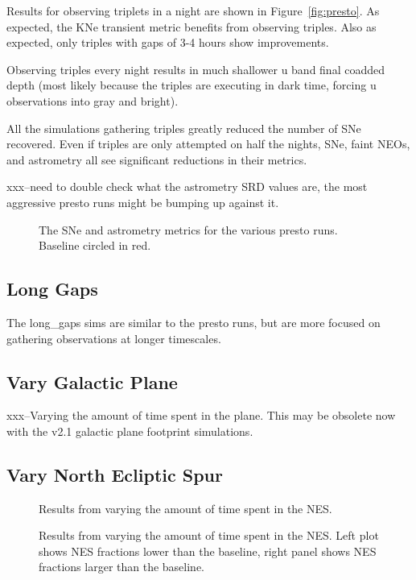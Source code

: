 Results for observing triplets in a night are shown in Figure~\ref{fig:presto}. As expected, the KNe transient metric benefits from observing triples. Also as expected, only triples with gaps of 3-4 hours show improvements.  

Observing triples every night results in much shallower u band final coadded depth (most likely because the triples are executing in dark time, forcing u observations into gray and bright). 

All the simulations gathering triples greatly reduced the number of SNe recovered. Even if triples are only attempted on half the nights, SNe, faint NEOs, and astrometry all see significant reductions in their metrics.


xxx--need to double check what the astrometry SRD values are, the most aggressive presto runs might be bumping up against it.

\begin{figure}
\caption{The SNe and astrometry metrics for the various presto runs. Baseline circled in red. \label{fig:presto_metics} }
\end{figure}

\subsection{Long Gaps}

The long\_gaps sims are similar to the presto runs, but are more focused on gathering observations at longer timescales.

\subsection{Vary Galactic Plane}

xxx--Varying the amount of time spent in the plane. This may be obsolete now with the v2.1 galactic plane footprint simulations. 


\subsection{Vary North Ecliptic Spur}

\begin{figure}
\caption{Results from varying the amount of time spent in the NES. \label{fig:vary_nes}}
\end{figure}

\begin{figure}
\caption{Results from varying the amount of time spent in the NES. Left plot shows NES fractions lower than the baseline, right panel shows NES fractions larger than the baseline.\label{fig:vary_nes_mags}}
\end{figure}


